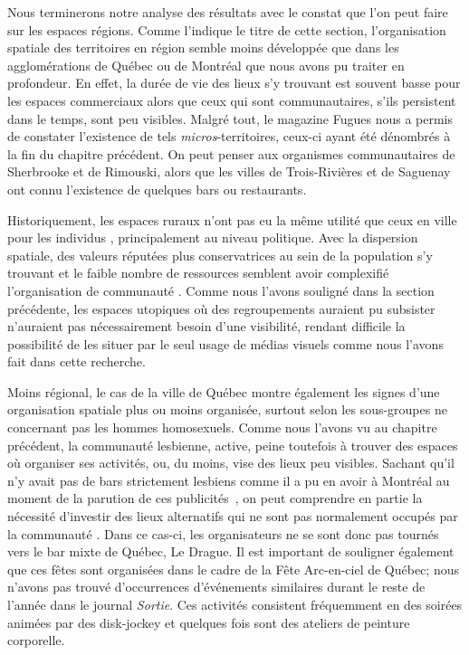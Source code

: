 Nous terminerons notre analyse des résultats avec le constat que l'on peut faire sur les espaces régions.
Comme l'indique le titre de cette section, l'organisation spatiale des territoires en région semble moins développée que dans les agglomérations de Québec ou de Montréal que nous avons pu traiter en profondeur.
En effet, la durée de vie des lieux \lgbt{} s'y trouvant est souvent basse pour les espaces commerciaux alors que ceux qui sont communautaires, s'ils persistent dans le temps, sont peu visibles.
Malgré tout, le magazine Fugues nous a permis de constater l'existence de tels \emph{micros}-territoires, ceux-ci ayant été dénombrés à la fin du chapitre précédent.
On peut penser aux organismes communautaires de Sherbrooke et de Rimouski, alors que les villes de Trois-Rivières et de Saguenay ont connu l'existence de quelques bars ou restaurants.

Historiquement, les espaces ruraux n'ont pas eu la même utilité que ceux en ville pour les individus \lgbt{}, principalement au niveau politique.
Avec la dispersion spatiale, des valeurs réputées plus conservatrices au sein de la population s'y trouvant et le faible nombre de ressources semblent avoir complexifié l'organisation de communauté \lgbt{}.
Comme nous l'avons souligné dans la section précédente, les espaces utopiques où des regroupements \lgbt{} auraient pu subsister n'auraient pas nécessairement besoin d'une visibilité, rendant difficile la possibilité de les situer par le seul usage de médias visuels comme nous l'avons fait dans cette recherche.

Moins régional, le cas de la ville de Québec montre également les signes d'une organisation spatiale plus ou moins organisée, surtout selon les sous-groupes ne concernant pas les hommes homosexuels.
Comme nous l'avons vu au chapitre précédent, la communauté lesbienne, active, peine toutefois à trouver des espaces où organiser ses activités, ou, du moins, vise des lieux peu visibles.
Sachant qu'il n'y avait pas de bars strictement lesbiens comme il a pu en avoir à Montréal au moment de la parution de ces publicités~\citep{Podmore2006}, on peut comprendre en partie la nécessité d'investir des lieux alternatifs qui ne sont pas normalement occupés par la communauté \lgbt{}.
Dans ce cas-ci, les organisateurs ne se sont donc pas tournés vers le bar mixte de Québec, Le Drague.
Il est important de souligner également que ces fêtes sont organisées dans le cadre de la Fête Arc-en-ciel de Québec; nous n'avons pas trouvé d'occurrences d'événements similaires durant le reste de l'année dans le journal \emph{Sortie}.
Ces activités consistent fréquemment en des soirées animées par des disk-jockey et quelques fois sont des ateliers de peinture corporelle.

